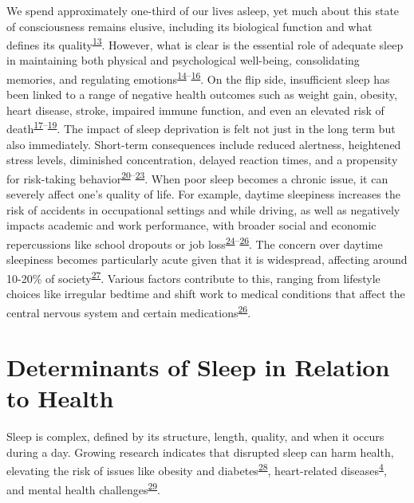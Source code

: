 \documentclass[
  10pt,
]{scrbook}
\begin{document}
We spend approximately one-third of our lives asleep, yet much about
this state of consciousness remains elusive, including its biological
function and what defines its
quality\textsuperscript{\protect\hyperlink{ref-ma_sleep_2017}{13}}.
However, what is clear is the essential role of adequate sleep in
maintaining both physical and psychological well-being, consolidating
memories, and regulating
emotions\textsuperscript{\protect\hyperlink{ref-worley_2018}{14}--\protect\hyperlink{ref-scott_2021}{16}}.
On the flip side, insufficient sleep has been linked to a range of
negative health outcomes such as weight gain, obesity, heart disease,
stroke, impaired immune function, and even an elevated risk of
death\textsuperscript{\protect\hyperlink{ref-consensus_conference_panel_recommended_2015}{17}--\protect\hyperlink{ref-hale_2020}{19}}.
The impact of sleep deprivation is felt not just in the long term but
also immediately. Short-term consequences include reduced alertness,
heightened stress levels, diminished concentration, delayed reaction
times, and a propensity for risk-taking
behavior\textsuperscript{\protect\hyperlink{ref-shochat_2014}{20}--\protect\hyperlink{ref-bonnet_1985}{23}}.
When poor sleep becomes a chronic issue, it can severely affect one's
quality of life. For example, daytime sleepiness increases the risk of
accidents in occupational settings and while driving, as well as
negatively impacts academic and work performance, with broader social
and economic repercussions like school dropouts or job
loss\textsuperscript{\protect\hyperlink{ref-connor_2002}{24}--\protect\hyperlink{ref-roth_1996}{26}}.
The concern over daytime sleepiness becomes particularly acute given
that it is widespread, affecting around 10-20\% of
society\textsuperscript{\protect\hyperlink{ref-wang_2019}{27}}. Various
factors contribute to this, ranging from lifestyle choices like
irregular bedtime and shift work to medical conditions that affect the
central nervous system and certain
medications\textsuperscript{\protect\hyperlink{ref-roth_1996}{26}}.

\hypertarget{determinants-of-sleep-in-relation-to-health}{%
\section{Determinants of Sleep in Relation to
Health}\label{determinants-of-sleep-in-relation-to-health}}

Sleep is complex, defined by its structure, length, quality, and when it
occurs during a day. Growing research indicates that disrupted sleep can
harm health, elevating the risk of issues like obesity and
diabetes\textsuperscript{\protect\hyperlink{ref-reutrakul_2018}{28}},
heart-related
diseases\textsuperscript{\protect\hyperlink{ref-cappuccio_sleep_2010}{4}},
and mental health
challenges\textsuperscript{\protect\hyperlink{ref-jouxe3o_2018}{29}}.
\end{document}
